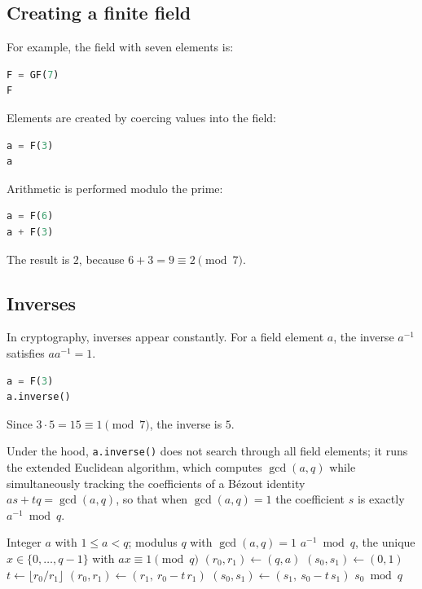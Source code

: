 \subsection{Creating a finite field}
For example, the field with seven elements is:

\begin{lstlisting}[language=Python]
F = GF(7)
F
\end{lstlisting}

Elements are created by coercing values into the field:

\begin{lstlisting}[language=Python]
a = F(3)
a
\end{lstlisting}

Arithmetic is performed modulo the prime:

\begin{lstlisting}[language=Python]
a = F(6)
a + F(3)
\end{lstlisting}

The result is $2$, because $6 + 3 = 9 \equiv 2 \pmod{7}$.

\subsection{Inverses}
In cryptography, inverses appear constantly. For a field element $a$, the inverse $a^{-1}$ satisfies $a a^{-1} = 1$.

\begin{lstlisting}[language=Python]
a = F(3)
a.inverse()
\end{lstlisting}

Since $3 \cdot 5 = 15 \equiv 1 \pmod{7}$, the inverse is $5$.

Under the hood, \texttt{a.inverse()} does not search through all field elements; it runs the extended Euclidean algorithm, which computes $\gcd(a,q)$ while simultaneously tracking the coefficients of a Bézout identity $as+tq=\gcd(a,q)$, so that when $\gcd(a,q)=1$ the coefficient $s$ is exactly $a^{-1} \bmod q$.

\begin{algorithm}[H]
\caption{Extended Euclidean Algorithm for Modular Inverse}
\label{alg:ext-euclid}
\begin{algorithmic}[1]
\Require Integer $a$ with $1 \le a < q$; modulus $q$ with $\gcd(a,q)=1$
\Ensure $a^{-1} \bmod q$, the unique $x \in \{0,\dots,q-1\}$ with $ax \equiv 1 \pmod{q}$
\State $(r_0, r_1) \gets (q, a)$
\State $(s_0, s_1) \gets (0, 1)$ 
    \State $t \gets \lfloor r_0 / r_1 \rfloor$
    \State $(r_0, r_1) \gets (r_1,\ r_0 - t\, r_1)$
    \State $(s_0, s_1) \gets (s_1,\ s_0 - t\, s_1)$
\EndWhile
\State \Return $s_0 \bmod q$ 
\end{algorithmic}
\end{algorithm}


